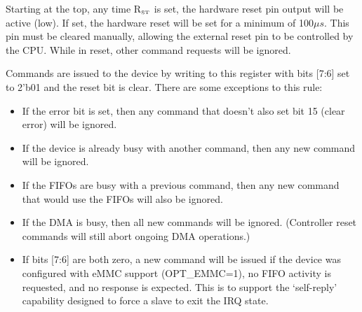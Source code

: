 \documentclass{gqtekspec}
\begin{document}
Starting at the top, any time R$_{\mbox{\tiny ST}}$ is set, the hardware
reset pin output will be active (low).  If set, the hardware reset will be set
for a minimum of 100$\mu s$.  This pin must be cleared manually, allowing
the external reset pin to be controlled by the CPU.  While in reset, other
command requests will be ignored.

Commands are issued to the device by writing to this register with bits [7:6]
set to 2'b01 and the reset bit is clear.  There are some exceptions to this
rule:
\begin{itemize}
\item If the error bit is set, then any command that doesn't also set bit 15
	(clear error) will be ignored.
\item If the device is already busy with another command, then any new command
	will be ignored.
\item If the FIFOs are busy with a previous command, then any new command that
	would use the FIFOs will also be ignored.
\item If the DMA is busy, then all new commands will be ignored.  (Controller
	reset commands will still abort ongoing DMA operations.)
\item If bits [7:6] are both zero, a new command will be issued if the device
	was configured with eMMC support (OPT\_EMMC=1), no FIFO activity
	is requested, and no response is expected.  This is to support the
	`self-reply' capability designed to force a slave to exit the IRQ
	state.
\end{itemize}
\end{document}

